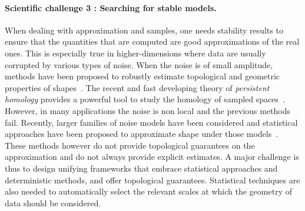 
\paragraph{Scientific challenge 3 : Searching for stable models.} 
When dealing with approximation and samples, one needs stability results to ensure that the quantities that are computed are good approximations of the real ones. This is especially true in higher-dimensions where data are usually corrupted by various types of noise.  When the noise is of small amplitude, methods have been proposed to robustly estimate topological and geometric properties of shapes~\cite{geometrica-ccl09,nsw-tvu-2011}. 
 The recent and fast developing theory of {\em persistent homology} provides a powerful tool to study  the homology of sampled spaces~\cite{eh-ph-2008}.
However, in  many applications the noise is non local and the previous methods fail.
Recently,  larger families of noise models  have been considered and statistical approaches  have been proposed to approximate shape under  those models~\cite{gpvw-mme-2011}. These methods however do not provide topological guarantees on the approximation and do not always provide explicit estimates. A major challenge is thus to design  unifying frameworks that embrace statistical approaches and deterministic methods, and offer topological guarantees.   Statistical techniques are also needed to automatically select the relevant scales at which the geometry of data should be considered.



